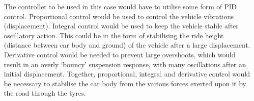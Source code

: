 \documentclass[11pt]{article}
\numberwithin{equation}{section}
\begin{document}
The controller to be used in this case would have to utilise some form of PID control. Proportional control would be used to control the vehicle vibrations (displacement). Integral control would be used to keep the vehicle stable after oscillatory action. This could be in the form of stabilising the ride height (distance between car body and ground) of the vehicle after a large displacement. Derivative control would be needed to prevent large overshoots, which would result in an overly `bouncy' suspension response, with many oscillations after an initial displacement. Together, proportional, integral and derivative control would be necessary to stabilise the car body from the various forces exerted upon it by the road through the tyres.


\end{document}
